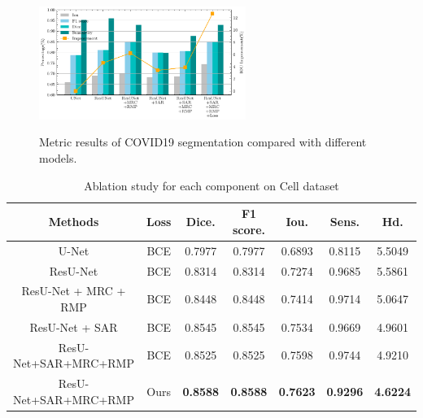 \documentclass[UTF8]{article} %
\begin{document}
  \begin{figure}[ht]
    \begin{center}
    \includegraphics[width=0.6\textwidth]{covid_comparison.pdf}
    \vspace{-2mm}
    \caption{Metric results of COVID19 segmentation compared with different models.} 
    \vspace{-2mm}
    \label{fig:covid_comparison}
    \end{center}
    \vspace{-0.35cm}
  \end{figure}

  \begin{table}[H]
    \vspace{-2mm}
    \begin{center}\small
    \label{loss-table}
    \begin{tabular}{ccccccc}
      
    \toprule
    Methods & Loss & Dice. & F1 score. & Iou. & Sens. & Hd.\\
    \midrule
      U-Net                & BCE & 0.7977 & 0.7977 & 0.6893 & 0.8115 & 5.5049\\
      ResU-Net             & BCE & 0.8314 & 0.8314 & 0.7274 & 0.9685 & 5.5861\\
      ResU-Net + MRC + RMP & BCE & 0.8448 & 0.8448 & 0.7414 & 0.9714 & 5.0647\\
      ResU-Net + SAR       & BCE & 0.8545 & 0.8545 & 0.7534 & 0.9669 & 4.9601\\
      ResU-Net+SAR+MRC+RMP & BCE & 0.8525 & 0.8525 & 0.7598 & 0.9744 & 4.9210\\
      ResU-Net+SAR+MRC+RMP & Ours & \textbf{0.8588} & \textbf{0.8588} & \textbf{0.7623} & \textbf{0.9296} & \textbf{4.6224}\\
  \bottomrule    
    \end{tabular}
    \caption{Ablation study for each component on Cell dataset}
    \end{center}
    \vspace{-4mm}
  \end{table}
\end{document}

